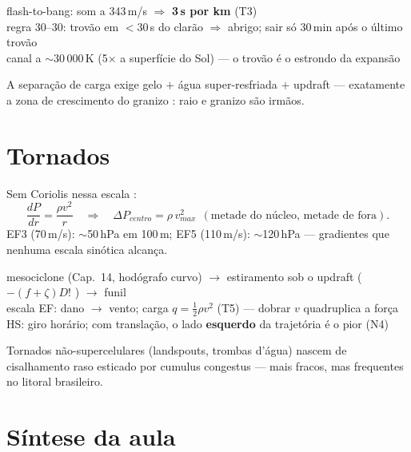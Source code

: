 \documentclass[11pt]{article}
\begin{document}
\begin{noquadro}
flash-to-bang: som a 343\,m/s $\Rightarrow$ \textbf{3\,s por km}
(T3)\\
regra 30--30: trovão em $<$30\,s do clarão $\Rightarrow$ abrigo; sair
só 30\,min após o último trovão\\
canal a $\sim$30\,000\,K (5$\times$ a superfície do Sol) — o trovão é
o estrondo da expansão
\end{noquadro}

A separação de carga exige gelo $+$ água super-resfriada $+$ updraft
— exatamente a zona de crescimento do granizo :
raio e granizo são irmãos.

\section{Tornados}\label{sec:tornado}


\begin{formadif}
Sem Coriolis nessa escala :
\[ \frac{dP}{dr} = \frac{\rho v^2}{r}
\quad\Longrightarrow\quad
\Delta P_{centro} = \rho\,v_{max}^2
\ \ (\text{metade do núcleo, metade de fora}). \]
EF3 (70\,m/s): $\sim$50\,hPa em 100\,m; EF5 (110\,m/s):
$\sim$120\,hPa — gradientes que nenhuma escala sinótica alcança.
\end{formadif}

\begin{noquadro}
mesociclone (Cap.~14, hodógrafo curvo) $\to$ estiramento sob o updraft
($-(f{+}\zeta)D$! ) $\to$ funil\\
escala EF: dano $\to$ vento; carga $q = \tfrac12\rho v^2$ (T5) —
dobrar $v$ quadruplica a força\\
HS: giro horário; com translação, o lado \textbf{esquerdo} da
trajetória é o pior (N4)
\end{noquadro}

Tornados não-supercelulares (landspouts, trombas d'água) nascem de
cisalhamento raso esticado por cumulus congestus — mais fracos, mas
frequentes no litoral brasileiro.

\section{Síntese da aula}
\end{document}
